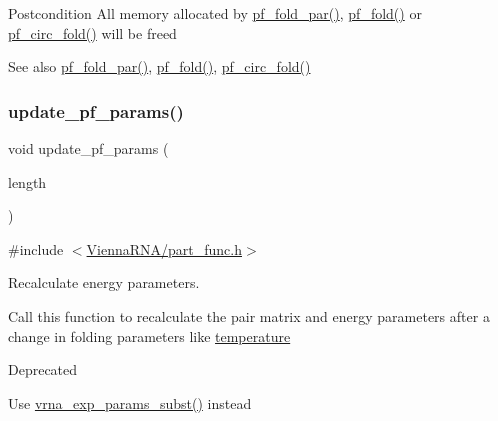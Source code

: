 \begin{DoxyPostcond}{Postcondition}
All memory allocated by \mbox{\hyperlink{group__pf__fold_gac4f95bee734b2563a3d6e9932117ebdf}{pf\+\_\+fold\+\_\+par()}}, \mbox{\hyperlink{group__pf__fold_gadc3db3d98742427e7001a7fd36ef28c2}{pf\+\_\+fold()}} or \mbox{\hyperlink{group__pf__fold_ga819ce5fca8984004ac81c4a3b04cb735}{pf\+\_\+circ\+\_\+fold()}} will be free\textquotesingle{}d 
\end{DoxyPostcond}
\begin{DoxySeeAlso}{See also}
\mbox{\hyperlink{group__pf__fold_gac4f95bee734b2563a3d6e9932117ebdf}{pf\+\_\+fold\+\_\+par()}}, \mbox{\hyperlink{group__pf__fold_gadc3db3d98742427e7001a7fd36ef28c2}{pf\+\_\+fold()}}, \mbox{\hyperlink{group__pf__fold_ga819ce5fca8984004ac81c4a3b04cb735}{pf\+\_\+circ\+\_\+fold()}} 
\end{DoxySeeAlso}
\mbox{\label{group__pf__fold_ga384e927890f9c034ff09fa66da102d28}} 
\subsubsection{\texorpdfstring{update\+\_\+pf\+\_\+params()}{update\_pf\_params()}}
{\footnotesize\ttfamily void update\+\_\+pf\+\_\+params (\begin{DoxyParamCaption}\item[{int}]{length }\end{DoxyParamCaption})}



{\ttfamily \#include $<$\mbox{\hyperlink{part__func_8h}{Vienna\+R\+N\+A/part\+\_\+func.\+h}}$>$}



Recalculate energy parameters. 

Call this function to recalculate the pair matrix and energy parameters after a change in folding parameters like \mbox{\hyperlink{group__model__details_gab4b11c8d9c758430960896bc3fe82ead}{temperature}}

\begin{DoxyRefDesc}{Deprecated}
\item[\mbox{\hyperlink{deprecated__deprecated000107}{Deprecated}}]Use \mbox{\hyperlink{group__energy__parameters_ga8e7ac4fab3b0cc03afbc134eaafb3525}{vrna\+\_\+exp\+\_\+params\+\_\+subst()}} instead\end{DoxyRefDesc}
\mbox{\label{group__pf__fold_gaafe2d1b21f5418b123b088aa395e827d}} 
